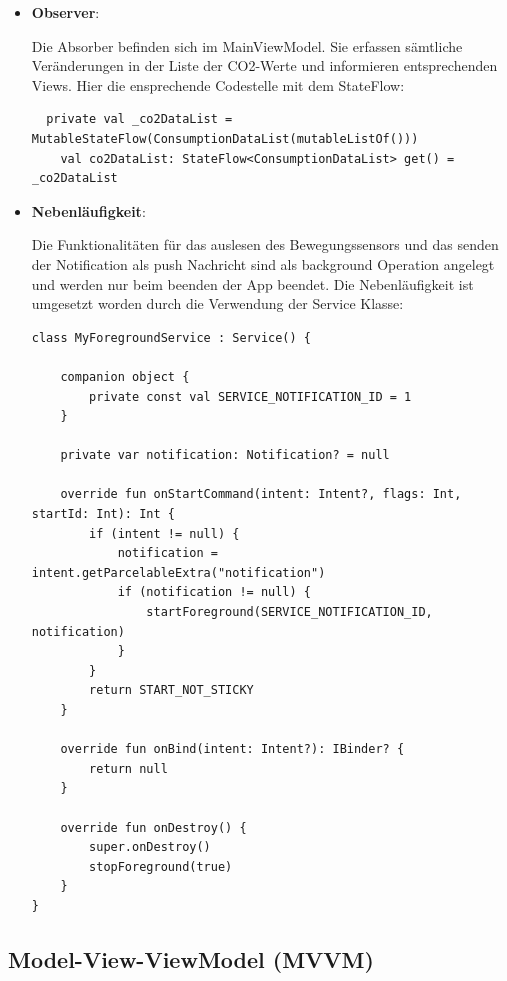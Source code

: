 \documentclass{article}
\begin{document}
\begin{itemize}
\item \textbf{Observer}:

Die Absorber befinden sich im MainViewModel. Sie erfassen sämtliche Veränderungen in der Liste der CO2-Werte und informieren entsprechenden Views.
Hier die ensprechende Codestelle mit dem StateFlow:
\begin{lstlisting}
  private val _co2DataList = MutableStateFlow(ConsumptionDataList(mutableListOf()))
    val co2DataList: StateFlow<ConsumptionDataList> get() = _co2DataList
\end{lstlisting}

\item \textbf{Nebenläufigkeit}:

Die Funktionalitäten für das auslesen des Bewegungssensors und das senden der Notification als push Nachricht sind als background Operation angelegt und werden nur beim beenden der App beendet. Die Nebenläufigkeit ist umgesetzt worden durch die Verwendung der Service Klasse:
 \begin{lstlisting}
class MyForegroundService : Service() {

    companion object {
        private const val SERVICE_NOTIFICATION_ID = 1
    }

    private var notification: Notification? = null

    override fun onStartCommand(intent: Intent?, flags: Int, startId: Int): Int {
        if (intent != null) {
            notification = intent.getParcelableExtra("notification")
            if (notification != null) {
                startForeground(SERVICE_NOTIFICATION_ID, notification)
            }
        }
        return START_NOT_STICKY
    }

    override fun onBind(intent: Intent?): IBinder? {
        return null
    }

    override fun onDestroy() {
        super.onDestroy()
        stopForeground(true)
    }
}
\end{lstlisting}
\end{itemize}


\subsection{ Model-View-ViewModel (MVVM)}
\end{document}
